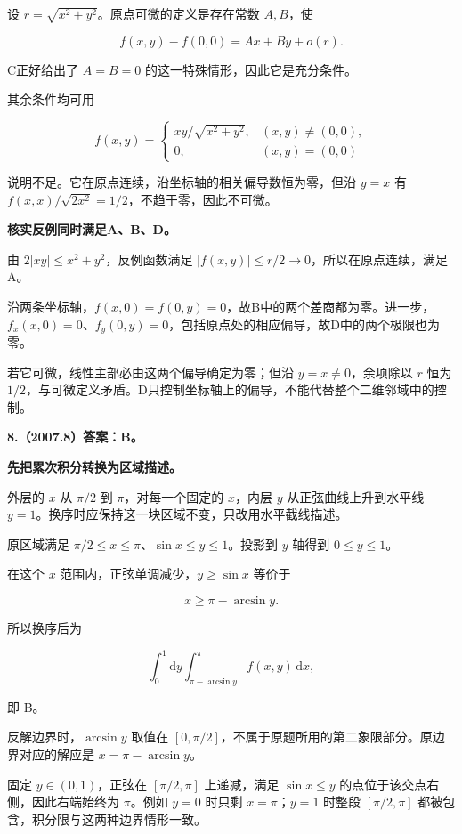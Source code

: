 \documentclass[UTF8,11pt,fontset=windows]{ctexart}
\begin{document}
设 $r=\sqrt{x^2+y^2}$。原点可微的定义是存在常数 $A,B$，使

$$
f(x,y)-f(0,0)=Ax+By+o(r).
$$

C正好给出了 $A=B=0$ 的这一特殊情形，因此它是充分条件。

其余条件均可用

$$
f(x,y)=\begin{cases}xy/\sqrt{x^2+y^2},&(x,y)\ne(0,0),\\0,&(x,y)=(0,0)
\end{cases}
$$

说明不足。它在原点连续，沿坐标轴的相关偏导数恒为零，但沿 $y=x$ 有 $f(x,x)/\sqrt{2x^2}=1/2$，不趋于零，因此不可微。

\textbf{核实反例同时满足A、B、D。}

由 $2|xy|\le x^2+y^2$，反例函数满足 $|f(x,y)|\le r/2\to0$，所以在原点连续，满足A。

沿两条坐标轴，$f(x,0)=f(0,y)=0$，故B中的两个差商都为零。进一步，$f_x(x,0)=0$、$f_y(0,y)=0$，包括原点处的相应偏导，故D中的两个极限也为零。

若它可微，线性主部必由这两个偏导确定为零；但沿 $y=x\ne0$，余项除以 $r$ 恒为 $1/2$，与可微定义矛盾。D只控制坐标轴上的偏导，不能代替整个二维邻域中的控制。

\clearpage

\textbf{8.（2007.8）答案：B。}

\textbf{先把累次积分转换为区域描述。}

外层的 $x$ 从 $\pi/2$ 到 $\pi$，对每一个固定的 $x$，内层 $y$ 从正弦曲线上升到水平线 $y=1$。换序时应保持这一块区域不变，只改用水平截线描述。

原区域满足 $\pi/2\le x\le\pi$、$\sin x\le y\le1$。投影到 $y$ 轴得到 $0\le y\le1$。

在这个 $x$ 范围内，正弦单调减少，$y\ge\sin x$ 等价于

$$
x\ge\pi-\arcsin y.
$$

所以换序后为

$$
\int_0^1\mathrm dy\int_{\pi-\arcsin y}^{\pi} f(x,y)\,\mathrm dx,
$$

即 B。

反解边界时，$\arcsin y$ 取值在 $[0,\pi/2]$，不属于原题所用的第二象限部分。原边界对应的解应是 $x=\pi-\arcsin y$。

固定 $y\in(0,1)$，正弦在 $[\pi/2,\pi]$ 上递减，满足 $\sin x\le y$ 的点位于该交点右侧，因此右端始终为 $\pi$。例如 $y=0$ 时只剩 $x=\pi$；$y=1$ 时整段 $[\pi/2,\pi]$ 都被包含，积分限与这两种边界情形一致。
\end{document}
